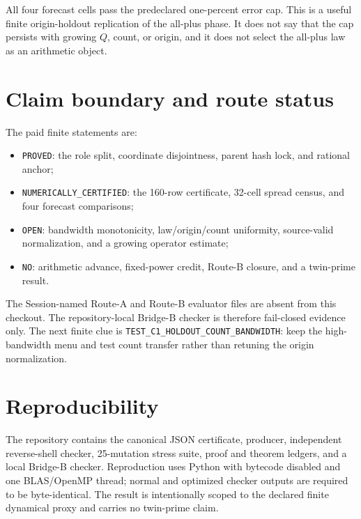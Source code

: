 \documentclass[10pt]{article}
\begin{document}
All four forecast cells pass the predeclared one-percent error cap.  This is
a useful finite origin-holdout replication of the all-plus phase.  It does
not say that the cap persists with growing $Q$, count, or origin, and it does
not select the all-plus law as an arithmetic object.

\section{Claim boundary and route status}

The paid finite statements are:
\begin{itemize}[leftmargin=18pt,itemsep=0pt]
\item \texttt{PROVED}: the role split, coordinate disjointness, parent hash
      lock, and rational anchor;
\item \texttt{NUMERICALLY\_CERTIFIED}: the 160-row certificate, 32-cell
      spread census, and four forecast comparisons;
\item \texttt{OPEN}: bandwidth monotonicity, law/origin/count uniformity,
      source-valid normalization, and a growing operator estimate;
\item \texttt{NO}: arithmetic advance, fixed-power credit, Route-B closure,
      and a twin-prime result.
\end{itemize}

The Session-named Route-A and Route-B evaluator files are absent from this
checkout.  The repository-local Bridge-B checker is therefore fail-closed
evidence only.  The next finite clue is
\texttt{TEST\_C1\_HOLDOUT\_COUNT\_BANDWIDTH}: keep the high-bandwidth menu and
test count transfer rather than retuning the origin normalization.

\section*{Reproducibility}

The repository contains the canonical JSON certificate, producer, independent
reverse-shell checker, 25-mutation stress suite, proof and theorem ledgers,
and a local Bridge-B checker.  Reproduction uses Python with bytecode disabled
and one BLAS/OpenMP thread; normal and optimized checker outputs are required
to be byte-identical.  The result is intentionally scoped to the declared
finite dynamical proxy and carries no twin-prime claim.
\end{document}
